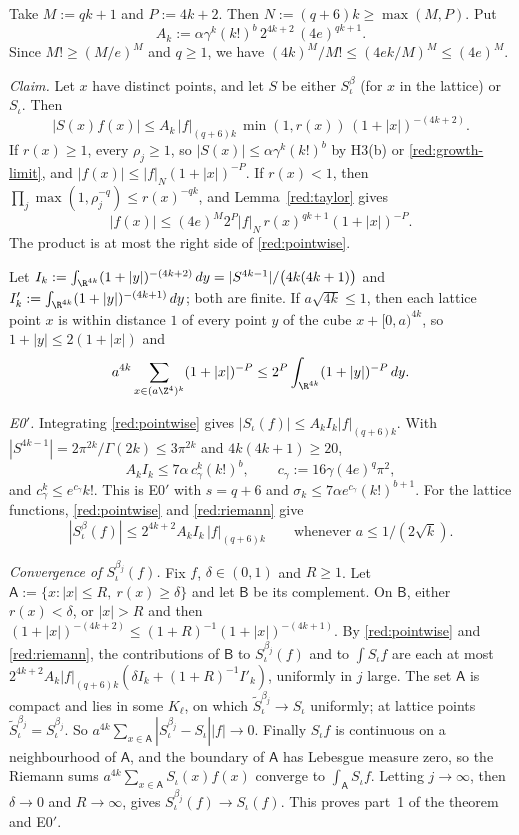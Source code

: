 Take $M:=qk+1$ and $P:=4k+2$. Then $N:=(q+6)k\ge\max(M,P)$. Put
\[
  A_k:=\alpha\gamma^k(k!)^b\,2^{4k+2}\,(4e)^{qk+1}.
\]
Since $M!\ge(M/e)^M$ and $q\ge1$, we have $(4k)^M/M!\le(4ek/M)^M\le(4e)^{M}$.

\emph{Claim.} Let $x$ have distinct points, and let $S$ be either $S^\beta_\iota$ (for $x$ in the lattice) or $S_\iota$. Then
\begin{equation}\label{red:pointwise}
  |S(x)f(x)|\le A_k\,|f|_{(q+6)k}\,\min(1,r(x))\,(1+|x|)^{-(4k+2)} .
\end{equation}
If $r(x)\ge1$, every $\rho_j\ge1$, so $|S(x)|\le\alpha\gamma^k(k!)^b$ by H3(b) or \eqref{red:growth-limit}, and $|f(x)|\le|f|_N(1+|x|)^{-P}$. If $r(x)<1$, then $\prod_j\max(1,\rho_j^{-q})\le r(x)^{-qk}$, and Lemma~\ref{red:taylor} gives
\[
|f(x)|\le(4e)^M2^P|f|_N\,r(x)^{qk+1}(1+|x|)^{-P}.
\] The product is at most the right side of \eqref{red:pointwise}.

Let $I_k:=\int_{\R^{4k}}(1+|y|)^{-(4k+2)}\,dy=|S^{4k-1}|/\bigl(4k(4k+1)\bigr)$ and $I'_k:=\int_{\R^{4k}}(1+|y|)^{-(4k+1)}\,dy$; both are finite. If $a\sqrt{4k}\le1$, then each lattice point $x$ is within distance $1$ of every point $y$ of the cube $x+[0,a)^{4k}$, so $1+|y|\le2(1+|x|)$ and
\begin{equation}\label{red:riemann}
  a^{4k}\sum_{x\in(a\Z^4)^k}(1+|x|)^{-P}\le2^P\int_{\R^{4k}}(1+|y|)^{-P}\,dy .
\end{equation}

\emph{E0$'$.} Integrating \eqref{red:pointwise} gives $|S_\iota(f)|\le A_kI_k|f|_{(q+6)k}$. With $|S^{4k-1}|=2\pi^{2k}/\Gamma(2k)\le3\pi^{2k}$ and $4k(4k+1)\ge20$,
\[
  A_kI_k\le7\alpha\,c_\gamma^k(k!)^b,\qquad c_\gamma:=16\gamma(4e)^q\pi^2,
\]
and $c_\gamma^k\le e^{c_\gamma} k!$. This is E0$'$ with $s=q+6$ and $\sigma_k\le7\alpha e^{c_\gamma}(k!)^{b+1}$. For the lattice functions, \eqref{red:pointwise} and \eqref{red:riemann} give
\begin{equation}\label{red:uniform}
  |S^\beta_\iota(f)|\le2^{4k+2}A_kI_k\,|f|_{(q+6)k}\qquad\text{whenever }a\le1/(2\sqrt k).
\end{equation}

\emph{Convergence of $S^{\beta_j}_\iota(f)$.} Fix $f$, $\delta\in(0,1)$ and $R\ge1$. Let $\mathsf A:=\{x:|x|\le R,\ r(x)\ge\delta\}$ and let $\mathsf B$ be its complement. On $\mathsf B$, either $r(x)<\delta$, or $|x|>R$ and then $(1+|x|)^{-(4k+2)}\le(1+R)^{-1}(1+|x|)^{-(4k+1)}$. By \eqref{red:pointwise} and \eqref{red:riemann}, the contributions of $\mathsf B$ to $S^{\beta_j}_\iota(f)$ and to $\int S_\iota f$ are each at most $2^{4k+2}A_k|f|_{(q+6)k}(\delta I_k+(1+R)^{-1}I'_k)$, uniformly in $j$ large. The set $\mathsf A$ is compact and lies in some $K_\ell$, on which $\tilde S^{\beta_j}_\iota\to S_\iota$ uniformly; at lattice points $\tilde S^{\beta_j}_\iota=S^{\beta_j}_\iota$. So $a^{4k}\sum_{x\in\mathsf A}|S^{\beta_j}_\iota-S_\iota||f|\to0$. Finally $S_\iota f$ is continuous on a neighbourhood of $\mathsf A$, and the boundary of $\mathsf A$ has Lebesgue measure zero, so the Riemann sums $a^{4k}\sum_{x\in\mathsf A}S_\iota(x)f(x)$ converge to $\int_{\mathsf A}S_\iota f$. Letting $j\to\infty$, then $\delta\to0$ and $R\to\infty$, gives $S^{\beta_j}_\iota(f)\to S_\iota(f)$. This proves part~1 of the theorem and E0$'$.


